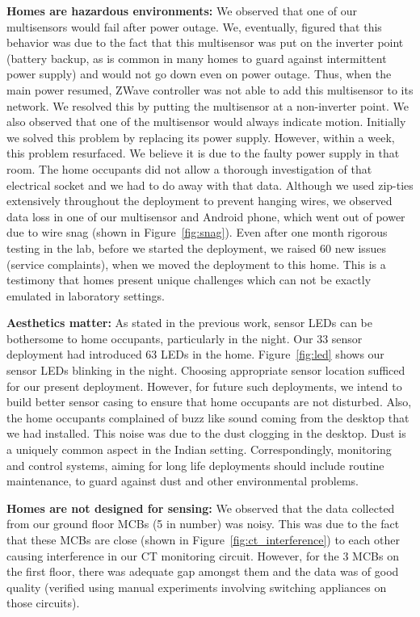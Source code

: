 \documentclass[10pt]{sensys-proc}
\newcommand{\figref}[1]{Figure~\ref{#1}}
\begin{document}
\noindent \textbf{Homes are hazardous environments:} We observed that one of our multisensors would fail after power outage. %
We, eventually, figured that this behavior was due to the fact that this multisensor was put on the inverter point (battery backup, as is common in many homes to guard against intermittent power supply) and would not go down even on power outage. Thus, when the main power resumed, ZWave controller was not able to add this multisensor to its network. We resolved this by putting the multisensor at a non-inverter point. We also observed that one of the multisensor would always indicate motion. Initially we solved this problem by replacing its power supply. However, within a week, this problem resurfaced. We believe it is due to the faulty power supply in that room. The home occupants did not allow a thorough investigation of that electrical socket and we had to do away with that data.
Although we used zip-ties extensively throughout the deployment to prevent hanging wires, we observed data loss in one of our multisensor and Android phone, which went out of power due to wire snag (shown in \figref{fig:snag}). Even after one month rigorous testing in the lab, before we started the deployment, we raised 60 new issues (service complaints), when we moved the deployment to this home. This is a testimony that homes present unique challenges which can not be exactly emulated in laboratory settings.

\noindent \textbf{Aesthetics matter:} As stated in the previous work, sensor LEDs can be bothersome to home occupants, particularly in the night. Our 33 sensor deployment had introduced 63 LEDs in the home. \figref{fig:led} shows our sensor LEDs blinking in the night. Choosing appropriate sensor location sufficed for our present deployment. However, for future such deployments, we intend to build better sensor casing to ensure that home occupants are not disturbed. Also, the home occupants complained of buzz like sound coming from the desktop that we had installed. This noise was due to the dust clogging in the desktop. Dust is a uniquely common aspect in the Indian setting. Correspondingly, {monitoring and control systems, aiming for long life deployments should include routine maintenance, to guard against dust and other environmental problems.}

\noindent \textbf{Homes are not designed for sensing:} We observed that the data collected from our ground floor MCBs (5 in number) was noisy. This was due to the fact that these MCBs are close (shown in \figref{fig:ct_interference}) to each other causing interference in our CT monitoring circuit. However, for the 3 MCBs on the first floor, there was adequate gap amongst them and the data was of good quality (verified using manual experiments involving switching appliances on those circuits). %
\end{document}
